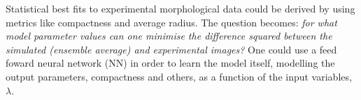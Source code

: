 Statistical best fits to experimental morphological
data could be derived by using metrics like compactness and
average radius. The question becomes: \textit{for 
what model parameter values can one minimise the difference squared
between the simulated (ensemble average) and experimental images?}
One could use a feed foward 
neural network (NN) in order to learn the model itself, 
modelling the output parameters, compactness and others, as a function of the input 
variables, $\lambda$.











